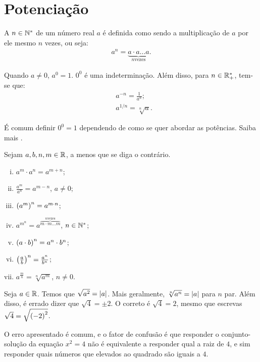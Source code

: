 \section{Potenciação}

\begin{definition}
A  $n \in \mathbb{N}^*$ de um número real $a$ é definida
como sendo a multiplicação de $a$ por ele mesmo $n$ vezes, ou seja:
%
\begin{align*}
a^n = \underbrace{a \cdot a  \dots  a}_{n \text{
vezes}}.
\end{align*}
\end{definition}

\begin{definition}
Quando $a \neq 0$, $a^0 = 1$. $0^0$ é uma indeterminação. Além disso, para $n \in \mathbb{R}^*_+$, tem-se que: 
\begin{align*}
&a^{-n} = \frac{1}{a^n}; \\
&a^{1/n} = \sqrt[n] a.
\end{align*}
\end{definition}

É comum definir $0^0 =1$ dependendo de como se quer abordar as potências. Saiba mais .

\begin{proposition}[Propriedades]
Sejam $a, b, n, m \in \mathbb{R}$, a menos que se diga o contrário.
\begin{enumerate}[i.]
  \item $a^m \cdot a^n = a^{m+n}$;
  \item $\frac {a^m}{a^n} = a^{m-n}$, $a \neq 0$;
  \item $\left(a^m\right)^n = a^{m\cdot n}$;
  \item $a^{m^n} = a^{\overbrace{m \cdot m  \dots  m}^{n \text{
  vezes}}}$, $n \in \mathbb{N}^*$;
  \item $\left(a \cdot b \right)^n= a^n \cdot b^n$;
  \item $\left(\frac a b \right)^n = \frac {a^n} {b^n}$;
  \item $a^{\frac m n} = \sqrt[n]{a^m}$, $n \neq 0$.
\end{enumerate}
\end{proposition}

\begin{remark}
Seja $a \in \mathbb{R}$. Temos que $\sqrt{a^2} = \left|a\right|$. Mais geralmente, $\sqrt[n] {a^n} = \left|a\right|$ para $n$ par. Além disso, é errado dizer que $\sqrt 4 = \pm 2$. O correto é $\sqrt 4 = 2$, mesmo que escrevas $\sqrt 4 = \sqrt{\left(-2\right)^2}$. 

O erro apresentado é comum, e o fator de confusão é que responder o conjunto-solução da equação $x^2=4$ não é equivalente a responder qual a raiz de $4$, e sim responder quais números que elevados ao quadrado são iguais a $4$.
\end{remark}

